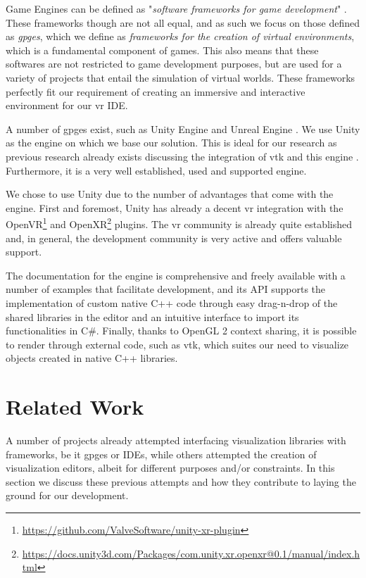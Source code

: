 Game Engines can be defined as "\textit{software frameworks for game development}" \cite{politowski2021game}. These frameworks though are not all equal, and as such we focus on those defined as \textit{\acrfull{gpge}s}, which we define as \textit{frameworks for the creation of virtual environments}, which is a fundamental component of games. This also means that these softwares are not restricted to game development purposes, but are used for a variety of projects that entail the simulation of virtual worlds. These frameworks perfectly fit our requirement of creating an immersive and interactive environment for our \acrshort{vr} IDE.

A number of \acrshort{gpge}s exist, such as Unity Engine \cite{haas2014history} and Unreal Engine \cite{unrealengine}. We use Unity as the engine on which we base our solution. This is ideal for our research as previous research already exists discussing the integration of \acrshort{vtk} and this engine \cite{wheeler_virtual_2018}. Furthermore, it is a very well established, used and supported engine.

We chose to use Unity due to the number of advantages that come with the engine. First and foremost, Unity has already a decent \acrshort{vr} integration with the OpenVR\footnote{\url{https://github.com/ValveSoftware/unity-xr-plugin}} and OpenXR\footnote{\url{https://docs.unity3d.com/Packages/com.unity.xr.openxr@0.1/manual/index.html}} plugins. The \acrshort{vr} community is already quite established and, in general, the development community is very active and offers valuable support. 

The documentation for the engine is comprehensive and freely available with a number of examples that facilitate development, and its API supports the implementation of custom native C++ code through easy drag-n-drop of the shared libraries in the editor and an intuitive interface to import its functionalities in C\#. Finally, thanks to OpenGL 2 context sharing, it is possible to render through external code, such as \acrshort{vtk}, which suites our need to visualize objects created in native C++ libraries.

\section{Related Work}
\label{sec:related-work}

A number of projects already attempted interfacing visualization libraries with frameworks, be it \acrshort{gpge}s or IDEs, while others attempted the creation of visualization editors, albeit for different purposes and/or constraints. In this section we discuss these previous attempts and how they contribute to laying the ground for our development.

